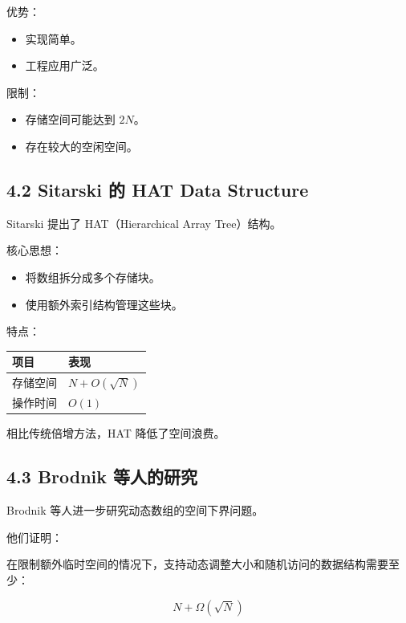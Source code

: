 \documentclass[
  UTF8,
  a4paper,
  12pt]{ctexart}
\newcounter{none} %
\providecommand{\tightlist}{%
  \setlength{\itemsep}{0pt}\setlength{\parskip}{0pt}}
\begin{document}
优势：

\begin{itemize}
\tightlist
\item
  实现简单。
\item
  工程应用广泛。
\end{itemize}

限制：

\begin{itemize}
\tightlist
\item
  存储空间可能达到 \(2N\)。
\item
  存在较大的空闲空间。
\end{itemize}

\subsection{4.2 Sitarski 的 HAT Data
Structure}\label{sitarski-ux7684-hat-data-structure}

Sitarski 提出了 HAT（Hierarchical Array Tree）结构。

核心思想：

\begin{itemize}
\tightlist
\item
  将数组拆分成多个存储块。
\item
  使用额外索引结构管理这些块。
\end{itemize}

特点：

{\def\LTcaptype{none} %
\begin{longtable}[]{@{}ll@{}}
\toprule\noalign{}
项目 & 表现 \\
\midrule\noalign{}
\endhead
\bottomrule\noalign{}
\endlastfoot
存储空间 & \(N+O(\sqrt{N})\) \\
操作时间 & \(O(1)\) \\
\end{longtable}
}

相比传统倍增方法，HAT 降低了空间浪费。

\subsection{4.3 Brodnik
等人的研究}\label{brodnik-ux7b49ux4ebaux7684ux7814ux7a76}

Brodnik 等人进一步研究动态数组的空间下界问题。

他们证明：

在限制额外临时空间的情况下，支持动态调整大小和随机访问的数据结构需要至少：

\[
N+\Omega(\sqrt{N})
\]
\end{document}
